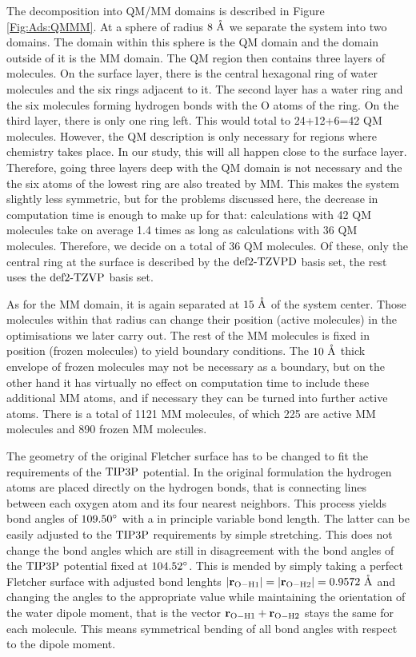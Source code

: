 \documentclass[8.5pt,twoside,twocolumn]{article}
\renewcommand{\Ang}{\mathring{\te{A}}}
\renewcommand\r{\bo r}
\theoremstyle{standard}
\begin{document}
The decomposition into QM/MM domains is described in Figure \ref{Fig:Ads:QMMM}.
At a sphere of radius $8~\Ang$ we separate the system into two domains. The
domain within this sphere is the QM domain and the domain outside of it
is the MM domain. 
The QM region then contains three layers of molecules. On the surface layer,
there is the central hexagonal ring of water molecules and the six
rings adjacent to it. The second layer has a water ring and the six
molecules forming hydrogen bonds with the O atoms of the ring. On 
the third layer, there is only one ring left. This would total
to 24+12+6=42 QM molecules. However, the QM description is only
necessary for regions where chemistry takes place. In our study,
this will all happen close to the surface layer. Therefore, going three
layers deep with the QM domain is not necessary and the the six
atoms of the lowest ring are also treated by MM. This makes the system slightly
less symmetric, but for the problems discussed here, the decrease in
computation time is enough to make up for that: calculations with 42 QM molecules
take on average 1.4 times as long as calculations with 36 QM molecules.
Therefore, we decide on a total of 36 QM molecules. Of these, only the central ring at
the surface is described by the $\text{def2-TZVPD}$ basis set, the rest
uses the $\text{def2-TZVP}$ basis set. 

As for the MM domain, it is again separated at $15~\Ang$ of the system center.
Those molecules within that radius can change their position (active molecules) in the optimisations we
later carry out. The rest of the MM molecules is fixed in position (frozen molecules) to yield
boundary conditions. The $10~\Ang$ thick envelope of frozen molecules may not be
necessary as a boundary, but on the other hand it has virtually no effect on
computation time to include these additional MM atoms, and if necessary they
can be turned into further active atoms. There is a total of 1121 MM molecules, of
which 225 are active MM molecules and 890 frozen MM molecules.

The geometry of the original Fletcher surface has to be changed to fit the requirements
of the $\text{TIP3P}$ potential. In the original formulation the hydrogen atoms
are placed directly on the hydrogen bonds, that is connecting lines between each oxygen atom
and its four nearest neighbors. This process yields bond angles of $109.50\degree$
with a in principle variable bond length. The latter can be easily adjusted
to the $\text{TIP3P}$ requirements by simple stretching. This does not change the bond angles which
are still in disagreement with the bond angles of the $\text{TIP3P}$ potential
fixed at $104.52\degree$. This is mended by simply taking a perfect
Fletcher surface with adjusted bond lenghts $\abs{\r_{\te O - \te H1}}=\abs{\r_{\te O - \te H2}}=0.9572~\Ang$
and changing the angles to the appropriate value while maintaining
the orientation of the water dipole moment, that is the vector $\r_{\te O - \te H1}+\r_{\te O - \te H2}$
stays the same for each molecule. This means symmetrical bending of all bond angles with
respect to the dipole moment.
\end{document}
